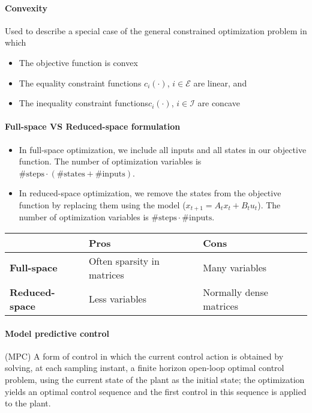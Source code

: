 
\paragraph{Convexity} Used to describe a special case of the general constrained optimization problem in which
\begin{itemize}[nolistsep,noitemsep]
    \item The objective function is convex
    \item The equality constraint functions $c_i(\cdot)$, $i \in \mathcal{E}$ are linear, and
    \item The inequality constraint functions$c_i(\cdot)$, $i \in \mathcal{I}$ are concave
\end{itemize}

\paragraph{Full-space VS Reduced-space formulation}  
 \begin{itemize}[nolistsep,noitemsep]
     \item In full-space optimization, we include all inputs and all states in our objective function. The number of optimization variables is $\#\mathrm{steps} \cdot (\#\mathrm{states} + \#\mathrm{inputs})$.
     \item In reduced-space optimization, we remove the states from the objective function by replacing them using the model ($x_{t+1} = A_t x_t + B_t u_t$). The number of optimization variables is $\#\mathrm{steps} \cdot \#\mathrm{inputs}$.
 \end{itemize}
 
\hskip-0.5cm
\begin{tabularx}{\linewidth}{X X X}
	& \textbf{Pros} & \textbf{Cons}\\
	\hline
	\textbf{Full-space} & Often sparsity in matrices & Many variables\\
	\textbf{Reduced-space} & Less variables & Normally dense matrices
\end{tabularx}

\paragraph{Model predictive control} (MPC) A form of control in which the current control action is obtained by solving, at each sampling instant, a finite horizon open-loop optimal control problem, using the current state of the plant as the initial state; the optimization yields an optimal control sequence and the first control in this sequence is applied to the plant.

